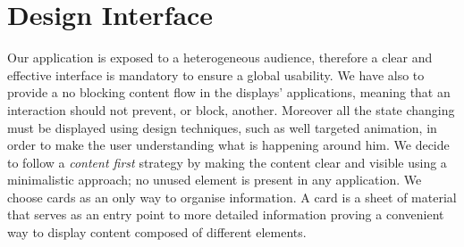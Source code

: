\documentclass[]{usiinfbachelorproject}
\begin{document}
\section{Design Interface}
Our application is exposed to a heterogeneous audience, therefore a clear and effective interface is mandatory to ensure a global usability. 
We have also to provide a no blocking content flow in the displays' applications, meaning that an interaction should not prevent, or block, another.
Moreover all the state changing must be displayed using design techniques, such as well targeted animation, in order to make the user understanding what is happening around him.
We decide to follow a \emph{content first} strategy by making the content clear and visible using a minimalistic approach; no unused element is present in any application. We choose cards as an only way to organise information. A card is a sheet of material that serves as an entry point to more detailed information proving a convenient way to display content composed of different elements.
\end{document}
